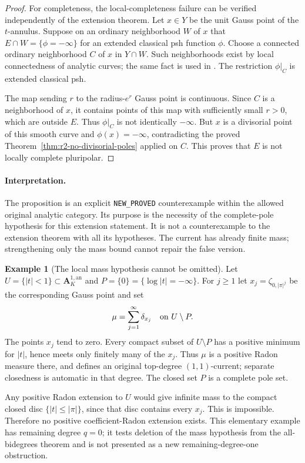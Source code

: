 \documentclass[11pt,a4paper]{article}
\numberwithin{equation}{section}
\theoremstyle{definition}
\newtheorem{example}[theorem]{Example}
\theoremstyle{remark}
\begin{document}
\begin{proof}
For completeness, the local-completeness failure can be
verified independently of the extension theorem. Let
$x\in Y$ be the unit Gauss point of the $t$-annulus.
Suppose on an ordinary neighborhood $W$ of $x$ that
$E\cap W=\{\phi=-\infty\}$ for an extended classical psh
function $\phi$. Choose a connected ordinary neighborhood
$C$ of $x$ in $Y\cap W$. Such neighborhoods exist by local
connectedness of analytic curves; the same fact is used in
\cite[proof of Proposition~3.5(3)]{GR25}.
The restriction $\phi|_C$ is extended classical psh.

The map sending $r$ to the radius-$e^r$ Gauss point is
continuous. Since $C$ is a neighborhood of $x$, it contains
points of this map with sufficiently small $r>0$, which are
outside $E$. Thus $\phi|_C$ is not identically $-\infty$.
But $x$ is a divisorial point of this smooth curve and
$\phi(x)=-\infty$, contradicting the proved
Theorem~\ref{thm:r2-no-divisorial-poles} applied on $C$.
This proves that $E$ is not locally complete pluripolar.
\end{proof}

\paragraph{Interpretation.}
The proposition is an explicit \texttt{NEW\_PROVED}
counterexample within the allowed original analytic category.
Its purpose is the necessity of the complete-pole hypothesis
for this extension statement. It is not a counterexample to
the extension theorem with all its hypotheses. The current
has already finite mass; strengthening only the mass bound
cannot repair the false version.

\begin{example}[The local mass hypothesis cannot be omitted]
\label{ex:r3-zero-extension-infinite-mass}
Let $U=\{|t|<1\}\subset\mathbf A_K^{1,\mathrm{an}}$ and
$P=\{0\}=\{\log|t|=-\infty\}$. For $j\geq1$ let
$x_j=\zeta_{0,|\pi|^j}$ be the corresponding Gauss point and set
\[
 \mu=\sum_{j=1}^{\infty}\delta_{x_j}
       \quad\hbox{on }U\setminus P.
\]
The points $x_j$ tend to zero. Every compact subset of
$U\setminus P$ has a positive minimum for $|t|$, hence meets
only finitely many of the $x_j$. Thus $\mu$ is a positive
Radon measure there, and defines an original top-degree
$(1,1)$-current; separate closedness is automatic in that
degree. The closed set $P$ is a complete pole set.

Any positive Radon extension to $U$ would give infinite mass
to the compact closed disc $\{|t|\leq|\pi|\}$, since that disc
contains every $x_j$. This is impossible. Therefore no
positive coefficient-Radon extension exists. This elementary
example has remaining degree $q=0$; it tests deletion of the
mass hypothesis from the all-bidegrees theorem and is not
presented as a new remaining-degree-one obstruction.
\end{example}
\end{document}
